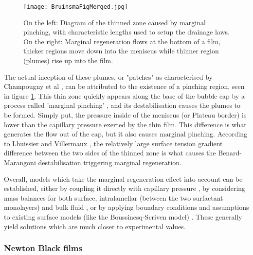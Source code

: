 \documentclass[a4paper,12pt]{article}
\numberwithin{equation}{section}
\numberwithin{figure}{section}
\numberwithin{table}{section}
\begin{document}
\begin{figure}[!htbp]
    \centering
    \captionsetup{width=.9\linewidth}
    \texttt{[image: BruinsmaFigMerged.jpg]}
    \caption{On the left: Diagram of the thinned zone caused by marginal pinching, with characteristic lengths used to setup the drainage laws. On the right: Marginal regeneration flows at the bottom of a film, thicker regions move down into the meniscus while thinner region (plumes) rise up into the film. \cite{Bruinsma1995}}
    \label{fig:BruinsmaMerge}
\end{figure}

The actual inception of these plumes, or "patches" as characterised by Champougny et al \cite{ChampougnyEvap2018}, can be attributed to the existence of a pinching region, seen in figure \ref{fig:BruinsmaMerge}. This thin zone quickly appears along the base of the bubble cap by a process called 'marginal pinching' \cite{Joye1994, Aradian2001}, and its destabilisation causes the plumes to be formed. Simply put, the pressure inside of the meniscus (or Plateau border) is lower than the capillary pressure exerted by the thin film. This difference is what generates the flow out of the cap, but it also causes marginal pinching. According to Lhuissier and Villermaux \cite{Lhuissier2011}, the relatively large surface tension gradient difference between the two sides of the thinned zone is what causes the Benard-Marangoni destabilisation triggering marginal regeneration.

Overall, models which take the marginal regeneration effect into account can be established, either by coupling it directly with capillary pressure \cite{Lhuissier2011}, by considering mass balances for both surface, intralamellar (between the two surfactant monolayers) and bulk fluid \cite{Nierstrasz1999}, or by applying boundary conditions and assumptions to existing surface models (like the Boussinesq-Scriven model) \cite{Bhamla2017}. These generally yield solutions which are much closer to experimental values.

\subsubsection{Newton Black films}
\label{sec:blackfilms}
\end{document}
